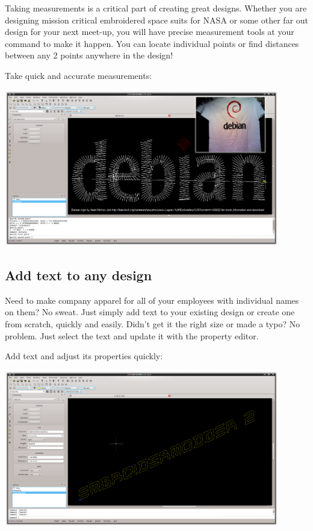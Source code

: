\documentclass[a4paper, 11pt]{report}
\begin{document}
Taking measurements is a critical part of creating great designs. Whether you are designing mission critical embroidered space suits for NASA or some other far out design for your next meet-up, you will have precise measurement tools at your command to make it happen. You can locate individual points or find distances between any 2 points anywhere in the design!

Take quick and accurate measurements:

\includegraphics[width=0.9\textwidth]{images/features-measure-1.png}

\subsection{Add text to any design}

Need to make company apparel for all of your employees with individual names on them? No sweat. Just simply add text to your existing design or create one from scratch, quickly and easily.
Didn't get it the right size or made a typo? No problem. Just select the text and update it with the property editor.

Add text and adjust its properties quickly:

\includegraphics[width=0.9\textwidth]{images/features-text-1.png}
\end{document}
